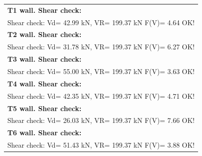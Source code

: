\tablelasttail{\hline}
\begin{center}
\begin{supertabular}{|l|}
\textbf{T1 wall. Shear check:}\\
  Shear check: Vd=  42.99 kN,  VR= 199.37 kN  F(V)= 4.64 OK!\\
\hline
\textbf{T2 wall. Shear check:}\\
  Shear check: Vd=  31.78 kN,  VR= 199.37 kN  F(V)= 6.27 OK!\\
\hline
\textbf{T3 wall. Shear check:}\\
  Shear check: Vd=  55.00 kN,  VR= 199.37 kN  F(V)= 3.63 OK!\\
\hline
\textbf{T4 wall. Shear check:}\\
  Shear check: Vd=  42.35 kN,  VR= 199.37 kN  F(V)= 4.71 OK!\\
\hline
\textbf{T5 wall. Shear check:}\\
  Shear check: Vd=  26.03 kN,  VR= 199.37 kN  F(V)= 7.66 OK!\\
\hline
\textbf{T6 wall. Shear check:}\\
  Shear check: Vd=  51.43 kN,  VR= 199.37 kN  F(V)= 3.88 OK!\\
\end{supertabular}
\end{center}

